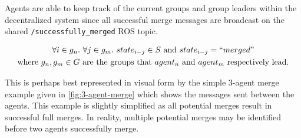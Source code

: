 Agents are able to keep track of the current groups and group leaders within the decentralized system since all successful merge messages are broadcast on the shared \texttt{/successfully\_merged} ROS topic.

\begin{equation}
    \begin{gathered} \label{eq:state-update-equation}
        \forall i \in g_n. \ \forall j \in g_m. \ state_{i-j} \in S \text{ and } state_{i-j} = ``merged" \\ \text{where $g_n, g_m \in G$ are the groups that $agent_n$ and $agent_m$ respectively lead.}
    \end{gathered}
\end{equation}

This is perhaps best represented in visual form by the simple 3-agent merge example given in \autoref{fig:3-agent-merge} which shows the messages sent between the agents. This example is slightly simplified as all potential merges result in successful full merges. In reality, multiple potential merges may be identified before two agents successfully merge.

